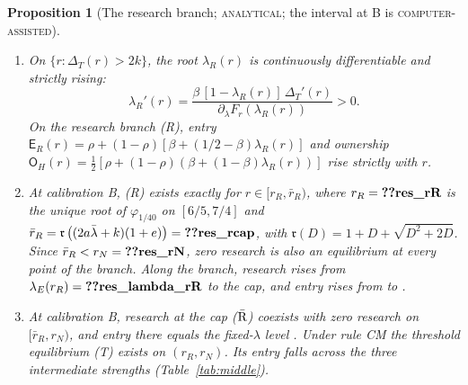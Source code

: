 \documentclass[12pt]{article}
\newtheorem{proposition}{Proposition}
\theoremstyle{definition}
\theoremstyle{remark}
\newcommand{\Ent}{\mathsf E}
\newcommand{\Own}{\mathsf O}
\newcommand{\fr}{\mathfrak r}
\newcommand{\DT}{\Delta_T}
\newcommand{\lb}{\bar\lambda}
\newcommand{\st}[1]{\textsc{#1}}
\begin{document}
\begin{proposition}[The research branch; \st{analytical}; the interval at B is \st{computer-assisted}]\label{prop:branch}
\begin{enumerate}[label=(\alph*),nosep]
\item On $\{r:\DT(r)>2k\}$, the root $\lambda_R(r)$ is continuously differentiable and strictly rising:
\begin{equation}\label{eq:dlam}
\lambda_R'(r)=\frac{\beta\,[1-\lambda_R(r)]\,\DT'(r)}{\partial_\lambda F_r(\lambda_R(r))}>0 .
\end{equation}
On the research branch (R), entry $\Ent_R(r)=\rho+(1-\rho)[\beta+(1/2-\beta)\lambda_R(r)]$ and ownership
$\Own_H(r)=\tfrac12[\rho+(1-\rho)(\beta+(1-\beta)\lambda_R(r))]$ rise strictly with $r$.
\item At calibration B, (R) exists exactly for $r\in[r_R,\bar r_R)$, where $r_R=\reg{res_rR}$ is the unique root of
$\varphi_{1/40}$ on $[6/5,7/4]$ and $\bar r_R=\fr\left((2a\lb+k)(1+e)\right)=\reg{res_rcap}$, with
$\fr(D)=1+D+\sqrt{D^2+2D}$. Since $\bar r_R<r_N=\reg{res_rN}$, zero research is also an equilibrium at every
point of the branch. Along the branch, research rises from $\lambda_E(r_R)=\reg{res_lambda_rR}$ to the cap, and
entry rises from  to .
\item At calibration B, research at the cap ($\bar{\rm R}$) coexists with zero research on $[\bar r_R,r_N)$, and
entry there equals the fixed-$\lambda$ level . Under rule CM the threshold equilibrium (T)
exists on $(r_R,r_N)$. Its entry falls across the three intermediate strengths
(Table~\ref{tab:middle}).
\end{enumerate}
\end{proposition}
\end{document}
